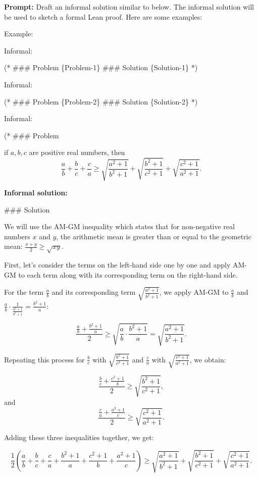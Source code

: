 \begin{tcolorbox}[breakable, enhanced, colback=black!5!white, colframe=black!75!white,  title=A Failed Case of \dsp]
{\small
\textbf{Prompt:} 
Draft an informal solution similar to below.  The informal solution will be used to sketch a formal Lean proof. Here are some examples:

Example:

Informal:

(* \#\#\# Problem \{Problem-1\} \#\#\# Solution \{Solution-1\} *)

Informal:

(* \#\#\# Problem \{Problem-2\} \#\#\# Solution \{Solution-2\} *)

Informal: 

(* \#\#\# Problem

if $a, b, c$ are positive real numbers, then
$$\frac{a}{b}+\frac{b}{c}+\frac{c}{a} \geq \sqrt{\frac{a^{2}+1}{b^{2}+1}}+\sqrt{\frac{b^{2}+1}{c^{2}+1}}+\sqrt{\frac{c^{2}+1}{a^{2}+1}} .$$

\tcbline

\textbf{Informal solution:}

\#\#\# Solution

We will use the AM-GM inequality which states that for non-negative real numbers $x$ and $y$, the arithmetic mean is greater than or equal to the geometric mean: $\frac{x+y}{2} \geq \sqrt{xy}$.

First, let's consider the terms on the left-hand side one by one and apply AM-GM to each term along with its corresponding term on the right-hand side.

For the term $\frac{a}{b}$ and its corresponding term $\sqrt{\frac{a^{2}+1}{b^{2}+1}}$, we apply AM-GM to $\frac{a}{b}$ and $\frac{a}{b}\cdot\frac{1}{\frac{a^{2}+1}{b^{2}+1}} = \frac{b^{2}+1}{a}$:

$$
\frac{\frac{a}{b} + \frac{b^{2}+1}{a}}{2} \geq \sqrt{\frac{a}{b} \cdot \frac{b^{2}+1}{a}} = \sqrt{\frac{a^{2}+1}{b^{2}+1}}.
$$

Repeating this process for $\frac{b}{c}$ with $\sqrt{\frac{b^{2}+1}{c^{2}+1}}$ and $\frac{c}{a}$ with $\sqrt{\frac{c^{2}+1}{a^{2}+1}}$, we obtain:

$$
\frac{\frac{b}{c} + \frac{c^{2}+1}{b}}{2} \geq \sqrt{\frac{b^{2}+1}{c^{2}+1}},
$$
and
$$
\frac{\frac{c}{a} + \frac{a^{2}+1}{c}}{2} \geq \sqrt{\frac{c^{2}+1}{a^{2}+1}}.
$$

Adding these three inequalities together, we get:

$$
\frac{1}{2} \left(\frac{a}{b} + \frac{b}{c} + \frac{c}{a} + \frac{b^{2}+1}{a} + \frac{c^{2}+1}{b} + \frac{a^{2}+1}{c}\right) \geq \sqrt{\frac{a^{2}+1}{b^{2}+1}} + \sqrt{\frac{b^{2}+1}{c^{2}+1}} + \sqrt{\frac{c^{2}+1}{a^{2}+1}}.
$$

}
\end{tcolorbox}
